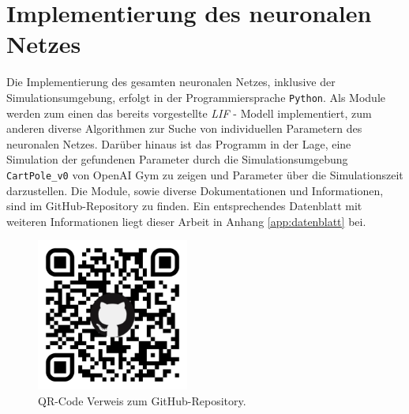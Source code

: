 %
\chapter{Implementierung des neuronalen Netzes}
\label{chap:imp}
%

	\begin{minipage}[b]{0.65\textwidth}
		Die Implementierung des gesamten neuronalen Netzes, inklusive der Simulationsumgebung, erfolgt in der Programmiersprache \texttt{Python}. Als Module werden zum einen das bereits vorgestellte \textit{LIF} - Modell implementiert, zum anderen diverse Algorithmen zur Suche von individuellen Parametern des neuronalen Netzes. Darüber hinaus ist das Programm in der Lage, eine Simulation der gefundenen Parameter durch die Simulationsumgebung \texttt{CartPole\_v0} von OpenAI Gym \cite{Brockman2016} zu zeigen und Parameter über die Simulationszeit darzustellen. Die Module, sowie diverse Dokumentationen und Informationen, sind im GitHub-Repository\footnotemark{} zu finden. Ein entsprechendes Datenblatt mit weiteren Informationen liegt dieser Arbeit in Anhang \ref{app:datenblatt} bei.
	\end{minipage}
	\begin{minipage}[b]{0.35\textwidth}
		\begin{figure}[H] %
			\centering
			\includegraphics[width=5cm]{figures/appendix/qr-code.pdf}
			\caption{QR-Code Verweis zum GitHub-Repository.}
			\label{fig:qr}
		\end{figure}
	\end{minipage}
		

